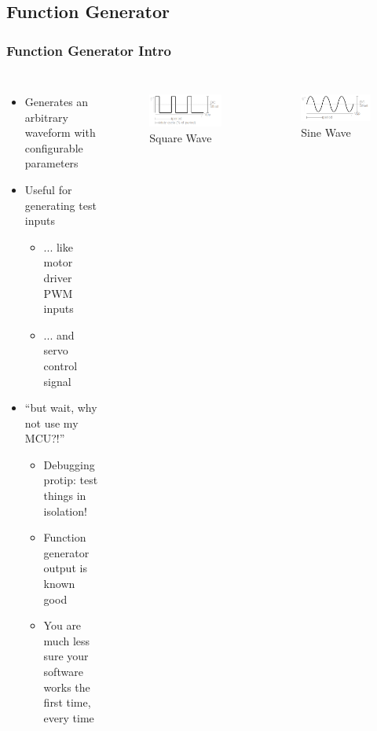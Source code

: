 \documentclass{beamer}
\begin{document}
\subsection{Function Generator}
\begin{frame}
\frametitle{Function Generator Intro}
\begin{columns}[t]
\begin{itemize}
  \item Generates an arbitrary waveform with configurable parameters
  \item Useful for generating test inputs
  \begin{itemize}
    \item ... like motor driver PWM inputs
    \item ... and servo control signal
  \end{itemize}
  \item ``but wait, why not use my MCU?!''
  \begin{itemize}
    \item<2-> Debugging protip: test things in isolation!
    \item<2-> Function generator output is known good
    \item<2-> You are much less sure your software works the first time, every time
  \end{itemize}
\end{itemize}

\begin{figure}
  \centering
  \includegraphics[width=1.0\columnwidth]{images-dis2/funcwave-square} \newline
  Square Wave
\end{figure}

\begin{figure}
  \centering
  \includegraphics[width=1.0\columnwidth]{images-dis2/funcwave-sine} \newline
  Sine Wave
\end{figure}
\end{columns}
\end{frame}
\end{document}
